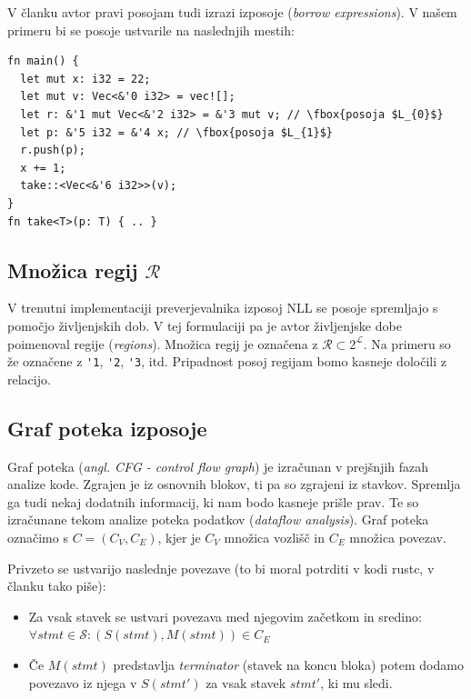 \documentclass[a4paper,12pt,openright]{book}
\begin{document}
V članku avtor pravi posojam tudi izrazi izposoje (\textit{borrow expressions}). V našem primeru bi se posoje ustvarile na naslednjih
mestih:

\begin{listing}[!ht]
	\begin{verbatim}
fn main() {
  let mut x: i32 = 22;
  let mut v: Vec<&'0 i32> = vec![];
  let r: &'1 mut Vec<&'2 i32> = &'3 mut v; // \fbox{posoja $L_{0}$}
  let p: &'5 i32 = &'4 x; // \fbox{posoja $L_{1}$}
  r.push(p);
  x += 1;
  take::<Vec<&'6 i32>>(v);
}
fn take<T>(p: T) { .. }
\end{verbatim}
	\caption{Posoje v programu}
	\label{listing:loans}
\end{listing}

\subsection{Množica regij $\mathcal{R}$}
V trenutni implementaciji preverjevalnika izposoj NLL se posoje spremljajo s pomočjo življenjskih dob.
V tej formulaciji pa je avtor življenjske dobe poimenoval regije (\textit{regions}).
Množica regij je označena z $\mathcal{R} \subset 2^{\mathcal{L}}$.
Na primeru so že označene z \verb|'1|, \verb|'2|, \verb|'3|, itd. Pripadnost posoj regijam bomo kasneje določili z relacijo.

\subsection{Graf poteka izposoje}
Graf poteka (\textit{angl. CFG - control flow graph}) je izračunan v prejšnjih fazah analize kode.
Zgrajen je iz osnovnih blokov, ti pa so zgrajeni iz stavkov. Spremlja ga tudi nekaj dodatnih informacij,
ki nam bodo kasneje prišle prav. Te so izračunane tekom analize poteka podatkov
(\textit{dataflow analysis})\cite{MIRDataflowRust}. Graf poteka označimo s $C = (C_{V}, C_{E})$, kjer
je $C_{V}$ množica vozlišč in $C_{E}$ množica povezav.


Privzeto se ustvarijo naslednje povezave (to bi moral potrditi v kodi rustc, v članku tako piše):

\begin{itemize}
	\item Za vsak stavek se ustvari povezava med njegovim začetkom in sredino:
	      $\forall stmt \in \mathcal{S}: (S(stmt), M(stmt)) \in C_{E}$
	\item Če $M(stmt)$ predstavlja \textit{terminator} (stavek na koncu bloka) potem dodamo povezavo iz njega v $S(stmt')$
	      za vsak stavek $stmt'$, ki mu sledi.
\end{itemize}
\end{document}
